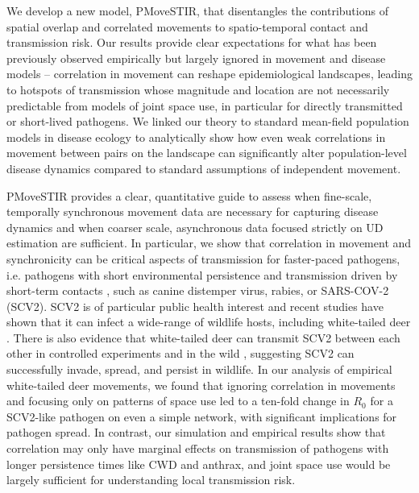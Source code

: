 ﻿\documentclass[11pt]{article}
\begin{document}
We develop a new model, PMoveSTIR, that disentangles the contributions of spatial overlap and correlated movements to spatio-temporal contact and transmission risk.   Our results provide clear expectations for what has been previously observed empirically but largely ignored in movement and disease models -- correlation in movement can reshape epidemiological landscapes, leading to hotspots of transmission whose magnitude and location are not necessarily predictable from models of joint space use, in particular for directly transmitted or short-lived pathogens.  We linked our theory to standard mean-field population models in disease ecology to analytically show how even weak correlations in movement between pairs on the landscape can significantly alter population-level disease dynamics compared to standard assumptions of independent movement.


PMoveSTIR provides a clear, quantitative guide to assess when fine-scale, temporally synchronous movement data are necessary for capturing disease dynamics and when coarser scale, asynchronous data focused strictly on UD estimation are sufficient. 
In particular, we show that correlation in movement and synchronicity can be critical aspects of transmission for faster-paced pathogens, i.e. pathogens with short environmental persistence and transmission driven by short-term contacts \citep[cf.][]{Dougherty2018,Manlove2022}, such as canine distemper virus, rabies, or SARS-COV-2 (SCV2). 
SCV2 is of particular public health interest and recent studies have shown that it can infect a wide-range of wildlife hosts, including white-tailed deer \citep{Palmer2021,Hale2022}. There is also evidence that white-tailed deer can transmit SCV2 between each other in controlled experiments and in the wild \citep{Martins2022,Hale2022}, suggesting SCV2 can successfully invade, spread, and persist in wildlife.  In our analysis of empirical white-tailed deer movements, we found that ignoring correlation in movements and focusing only on patterns of space use led to a ten-fold change in $R_0$ for a SCV2-like pathogen on even a simple network, with significant implications for pathogen spread.  In contrast, our simulation and empirical results show that correlation may only have marginal effects on transmission of pathogens with longer persistence times like CWD and anthrax, and joint space use would be largely sufficient for understanding local transmission risk.
\end{document}
